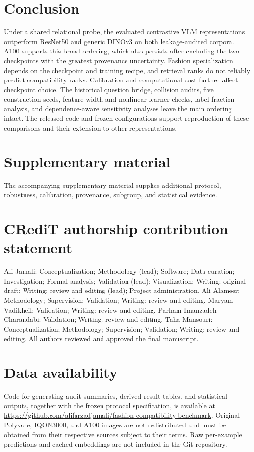 \documentclass[preprint,12pt]{elsarticle}
\begin{document}
\section{Conclusion}\label{sec:conclusion}

Under a shared relational probe, the evaluated contrastive VLM representations outperform ResNet50 and generic DINOv3 on both leakage-audited corpora. A100 supports this broad ordering, which also persists after excluding the two checkpoints with the greatest provenance uncertainty. Fashion specialization depends on the checkpoint and training recipe, and retrieval ranks do not reliably predict compatibility ranks. Calibration and computational cost further affect checkpoint choice. The historical question bridge, collision audits, five construction seeds, feature-width and nonlinear-learner checks, label-fraction analysis, and dependence-aware sensitivity analyses leave the main ordering intact. The released code and frozen configurations support reproduction of these comparisons and their extension to other representations.

\section*{Supplementary material}
The accompanying supplementary material supplies additional protocol, robustness, calibration, provenance, subgroup, and statistical evidence.

\section*{CRediT authorship contribution statement}
Ali Jamali: Conceptualization; Methodology (lead); Software; Data curation; Investigation; Formal analysis; Validation (lead); Visualization; Writing: original draft; Writing: review and editing (lead); Project administration. Ali Alameer: Methodology; Supervision; Validation; Writing: review and editing. Maryam Vadikheil: Validation; Writing: review and editing. Parham Imanzadeh Charandabi: Validation; Writing: review and editing. Taha Mansouri: Conceptualization; Methodology; Supervision; Validation; Writing: review and editing. All authors reviewed and approved the final manuscript.

\section*{Data availability}
Code for generating audit summaries, derived result tables, and statistical outputs, together with the frozen protocol specification, is available at \url{https://github.com/alifarzadjamali/fashion-compatibility-benchmark}. Original Polyvore, IQON3000, and A100 images are not redistributed and must be obtained from their respective sources subject to their terms. Raw per-example predictions and cached embeddings are not included in the Git repository.
\end{document}

